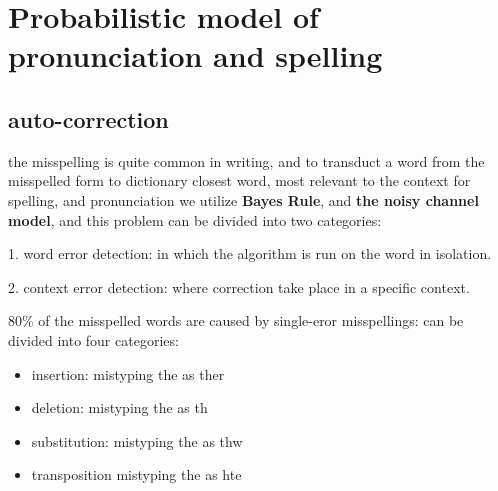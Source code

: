 \documentclass[4apaper,12pt]{book}
\begin{document}
\section{Probabilistic model of pronunciation and spelling}
\begin{description}
  \subsection{auto-correction}
\item the misspelling is quite common in writing, and to transduct a word from the misspelled form to dictionary closest word, most relevant to the context for spelling, and pronunciation we utilize \textbf{Bayes Rule}, and \textbf{the noisy channel model}, and this problem can be divided into two categories:
\item 1. word error detection: in which the algorithm is run on the word in isolation.
\item 2. context error detection: where correction take place in a specific context.
\item 80\% of the misspelled words are caused by single-eror misspellings: can be divided into four categories:
  \begin{itemize}
  \item insertion: mistyping the as ther
  \item deletion: mistyping the as th
  \item substitution: mistyping the as thw
  \item transposition mistyping the as hte
  \end{itemize}

\end{description}
\end{document}
